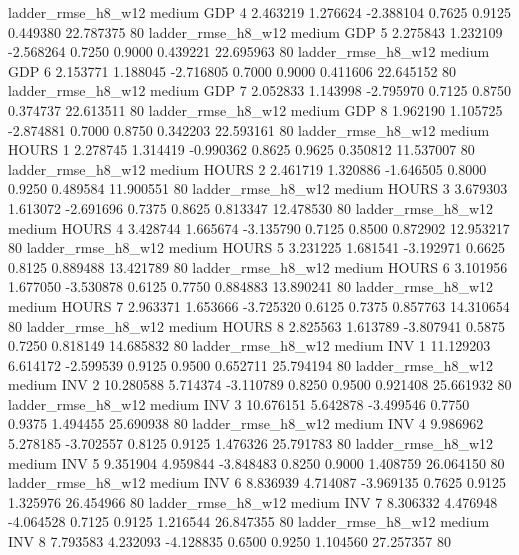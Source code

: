     ladder_rmse_h8_w12     medium      GDP                 4  2.463219 1.276624 -2.388104 0.7625 0.9125  0.449380   22.787375 80
    ladder_rmse_h8_w12     medium      GDP                 5  2.275843 1.232109 -2.568264 0.7250 0.9000  0.439221   22.695963 80
    ladder_rmse_h8_w12     medium      GDP                 6  2.153771 1.188045 -2.716805 0.7000 0.9000  0.411606   22.645152 80
    ladder_rmse_h8_w12     medium      GDP                 7  2.052833 1.143998 -2.795970 0.7125 0.8750  0.374737   22.613511 80
    ladder_rmse_h8_w12     medium      GDP                 8  1.962190 1.105725 -2.874881 0.7000 0.8750  0.342203   22.593161 80
    ladder_rmse_h8_w12     medium    HOURS                 1  2.278745 1.314419 -0.990362 0.8625 0.9625  0.350812   11.537007 80
    ladder_rmse_h8_w12     medium    HOURS                 2  2.461719 1.320886 -1.646505 0.8000 0.9250  0.489584   11.900551 80
    ladder_rmse_h8_w12     medium    HOURS                 3  3.679303 1.613072 -2.691696 0.7375 0.8625  0.813347   12.478530 80
    ladder_rmse_h8_w12     medium    HOURS                 4  3.428744 1.665674 -3.135790 0.7125 0.8500  0.872902   12.953217 80
    ladder_rmse_h8_w12     medium    HOURS                 5  3.231225 1.681541 -3.192971 0.6625 0.8125  0.889488   13.421789 80
    ladder_rmse_h8_w12     medium    HOURS                 6  3.101956 1.677050 -3.530878 0.6125 0.7750  0.884883   13.890241 80
    ladder_rmse_h8_w12     medium    HOURS                 7  2.963371 1.653666 -3.725320 0.6125 0.7375  0.857763   14.310654 80
    ladder_rmse_h8_w12     medium    HOURS                 8  2.825563 1.613789 -3.807941 0.5875 0.7250  0.818149   14.685832 80
    ladder_rmse_h8_w12     medium      INV                 1 11.129203 6.614172 -2.599539 0.9125 0.9500  0.652711   25.794194 80
    ladder_rmse_h8_w12     medium      INV                 2 10.280588 5.714374 -3.110789 0.8250 0.9500  0.921408   25.661932 80
    ladder_rmse_h8_w12     medium      INV                 3 10.676151 5.642878 -3.499546 0.7750 0.9375  1.494455   25.690938 80
    ladder_rmse_h8_w12     medium      INV                 4  9.986962 5.278185 -3.702557 0.8125 0.9125  1.476326   25.791783 80
    ladder_rmse_h8_w12     medium      INV                 5  9.351904 4.959844 -3.848483 0.8250 0.9000  1.408759   26.064150 80
    ladder_rmse_h8_w12     medium      INV                 6  8.836939 4.714087 -3.969135 0.7625 0.9125  1.325976   26.454966 80
    ladder_rmse_h8_w12     medium      INV                 7  8.306332 4.476948 -4.064528 0.7125 0.9125  1.216544   26.847355 80
    ladder_rmse_h8_w12     medium      INV                 8  7.793583 4.232093 -4.128835 0.6500 0.9250  1.104560   27.257357 80
